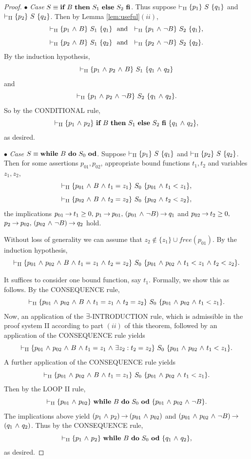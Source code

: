 \documentclass[runningheads]{llncs}       %
\begin{document}
\begin{proof}
\vspace{2mm}

\NI
$\bullet$ \emph{Case} $S \equiv \ITE{B}{S_1}{S_2}$.
Thus suppose $\vdash_{\rm{II}} \HT{p_1}{S}{q_1}$ and
$\vdash_{\rm{II}} \HT{p_2}{S}{q_2}$.
Then by Lemma \ref{lem:useful}$(ii)$,
\[
 \vdash_{\rm{II}} \HT{p_{1}\A B}{S_1}{q_{1}} \ \mbox{ and }\
 \vdash_{\rm{II}} \HT{p_{1}\A \neg B}{S_2}{q_{1}},
\]
\[
 \vdash_{\rm{II}} \HT{p_{2} \A B}{S_1}{q_{2}} \ \mbox{ and }\
 \vdash_{\rm{II}} \HT{p_{2} \A \neg B}{S_2}{q_{2}}.
\]
By the induction hypothesis,
\[
 \vdash_{\rm{II}} \HT{p_{1}\A p_{2} \A B}{S_1}{q_{1} \A q_{2}}
\]
and
\[
 \vdash_{\rm{II}} \HT{p_{1}\A p_{2} \A \neg B}{S_2}{q_{1} \A q_{2}}.
\]
So by the CONDITIONAL rule,
\[
  \vdash_{\rm{II}} \HT{p_1 \A p_2}{\ITE{B}{S_1}{S_2}}{q_1 \A q_2},
\]
as desired.

\vspace{2mm}

\NI
$\bullet$ \emph{Case} $S \equiv \WDD{B}{S_0}$.
Suppose $\vdash_{\rm{II}} \HT{p_1}{S}{q_1}$ and
$\vdash_{\rm{II}} \HT{p_2}{S}{q_2}$.
Then for some assertions $p_{01},p_{02}$, appropriate bound functions $t_1, t_2$ and
variables $z_1, z_2$,
\[
 \vdash_{\rm{II}} \HT{p_{01} \A B \A t_1 = z_1}{S_0}{p_{01} \A t_1 < z_1},
\]
\[
 \vdash_{\rm{II}} \HT{p_{02} \A B \A t_2 = z_2}{S_0}{p_{02} \A t_2 < z_2},
\]
the implications
$p_{01} \ra t_1 \ge 0, \, p_1 \ra p_{01}, \, (p_{01} \A \neg B) \ra q_1$
and
$p_{02} \ra t_2 \ge 0,$ $p_2 \ra p_{02}, \, (p_{02} \A \neg B) \ra q_2$
hold.

Without loss of generality we can assume that $z_2 \not \in \{z_1\} \cup \mathit{free}(p_{01})$.
By the induction hypothesis,
\[
 \vdash_{\rm{II}} \HT{p_{01} \A p_{02} \A B \A t_1 = z_1 \A t_2 = z_2}{S_0}
                     {p_{01} \A p_{02} \A t_1 < z_1 \A t_2 < z_2}.
\]

It suffices to consider one bound function, say $t_1$.
Formally, we show this as follows.
By the CONSEQUENCE rule,
\[
 \vdash_{\rm{II}} \HT{p_{01} \A p_{02} \A B \A t_1 = z_1 \A t_2 = z_2}{S_0}
                     {p_{01} \A p_{02} \A t_1 < z_1}.
\]
Now, an application of the $\te$-INTRODUCTION rule, which is admissible
in the proof system II according to part $(ii)$ of this theorem, followed by an application
of the CONSEQUENCE rule yields
\[
 \vdash_{\rm{II}} \HT{p_{01} \A p_{02} \A B \A t_1 = z_1 \A \te z_2: t_2 = z_2}{S_0}
                     {p_{01} \A p_{02} \A t_1 < z_1}.
\]
A further application of the CONSEQUENCE rule yields
\[
 \vdash_{\rm{II}} \HT{p_{01} \A p_{02} \A B \A t_1 = z_1}{S_0}
                     {p_{01} \A p_{02} \A t_1 < z_1}.
\]
Then by the LOOP II rule,
\[
  \vdash_{\rm{II}} \HT{p_{01} \A p_{02}}{\WDD{B}{S_0}}{p_{01} \A p_{02} \A \neg B}.
\]
The implications above yield
$(p_1 \A p_2) \ra (p_{01} \A p_{02})$ and
$(p_{01} \A p_{02} \A \neg B) \ra$ $(q_1 \A q_2)$.
Thus by the CONSEQUENCE rule,
\[
 \vdash_{\rm{II}} \HT{p_1 \A p_2}{\WDD{B}{S_0}}{q_1 \A q_2},
\]
as desired.
\vspace{3mm}


\end{proof}
\end{document}
